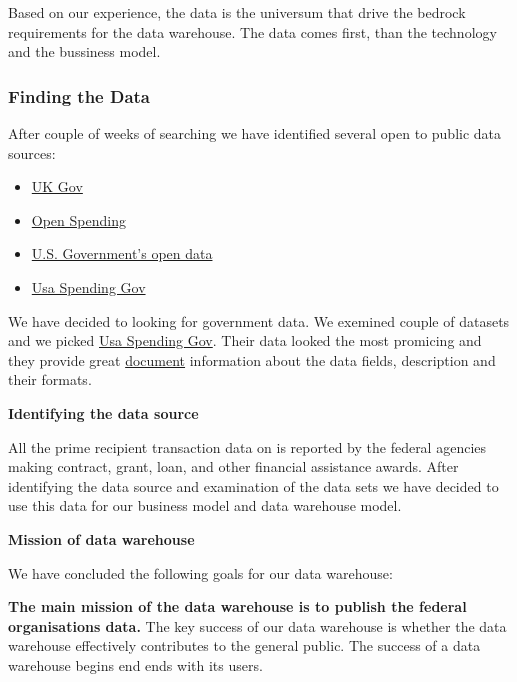 \documentclass[letterpaper,10pt,oneside]{sphinxmanual}
\begin{document}
Based on our experience, the data is the universum that drive the bedrock requirements for
the data warehouse. The data comes first, than the technology and the bussiness model.


\subsubsection{Finding the Data}
\label{datawarehouse:finding-the-data}
After couple of weeks of searching we have identified several open to public data sources:
\begin{itemize}
\item {} 
\href{https://www.gov.uk}{UK Gov}

\item {} 
\href{https://openspending.org}{Open Spending}

\item {} 
\href{https://www.data.gov}{U.S. Government’s open data}

\item {} 
\href{https://www.usaspending.gov/Pages/Default.aspx}{Usa Spending Gov}

\end{itemize}

We have decided to looking for government data. We exemined couple of datasets and
we picked \href{https://www.usaspending.gov/Pages/Default.aspx}{Usa Spending Gov}.
Their data looked the most promicing and they provide great
\href{https://www.usaspending.gov/about/PublishingImages/Pages/TheData/USAspending.gov\%20Data\%20Dictionary.pdf}{document}
information about the data fields, description and their formats.

\textbf{Identifying the data source}

All the prime recipient transaction data on 
is reported by the federal agencies making contract, grant, loan, and other financial assistance awards.
After identifying the data source and examination of the data sets we have decided to use this data
for our business model and data warehouse model.

\textbf{Mission of data warehouse}

We have concluded the following goals for our data warehouse:

\textbf{The main mission of the data warehouse is to publish the federal organisations data.}
The key success of our data warehouse is whether the data warehouse effectively contributes to the general public.
The success of a data warehouse begins end ends with its users.
\end{document}
